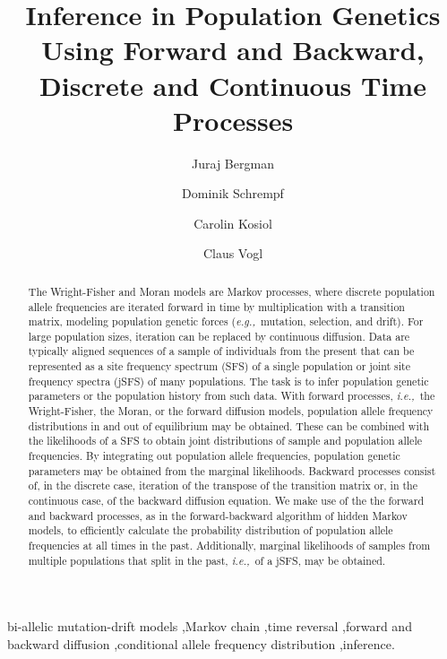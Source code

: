 \documentclass[preprint]{elsarticle}
\newcommand\eg{{\it e.g.,}}
\newcommand\ie{{\it i.e.,}}
\begin{document}
\begin{frontmatter}

\title{Inference in Population Genetics Using Forward and Backward, Discrete and Continuous Time Processes}

\author[address1,address2]{Juraj Bergman}
\author[address1,address2]{Dominik Schrempf}
\author[address1]{Carolin Kosiol}
\author[address3]{Claus Vogl}

\address[address1]{Institut f\"ur Populationsgenetik, Vetmeduni Vienna, Veterin\"arplatz 1, A-1210 Wien, Austria}
\address[address2]{Vienna Graduate School of Population Genetics, A-1210 Wien, Austria}
\address[address3]{Institut f\"ur Tierzucht und Genetik, Vetmeduni Vienna, Veterin\"arplatz 1, A-1210 Wien, Austria}

\begin{abstract}
The Wright-Fisher and Moran models are Markov processes, where discrete population allele frequencies are iterated forward in time by multiplication with a transition matrix, modeling population genetic forces (\eg\ mutation, selection, and drift). For large population sizes, iteration can be replaced by continuous diffusion. Data are typically aligned sequences of a sample of individuals from the present that can be represented as a site frequency spectrum (SFS) of a single population or joint site frequency spectra (jSFS) of many populations. The task is to infer population genetic parameters or the population history from such data. With forward processes, \ie\ the Wright-Fisher, the Moran, or the forward diffusion models, population allele frequency distributions in and out of equilibrium may be obtained. These can be combined with the likelihoods of a SFS to obtain joint distributions of sample and population allele frequencies. By integrating out population allele frequencies, population genetic parameters may be obtained from the marginal likelihoods. Backward processes consist of, in the discrete case, iteration of the transpose of the transition matrix or, in the continuous case, of the backward diffusion equation. We make use of the the forward and backward processes, as in the forward-backward algorithm of hidden Markov models, to efficiently calculate the probability distribution of population allele frequencies at all times in the past. Additionally, marginal likelihoods of samples from multiple populations that split in the past, \ie\ of a jSFS, may be obtained.
\end{abstract}
\begin{keyword}
bi-allelic mutation-drift models \sep Markov chain \sep time reversal \sep forward and backward diffusion \sep conditional allele frequency distribution \sep inference.
\end{keyword}

\end{frontmatter}
\end{document}
